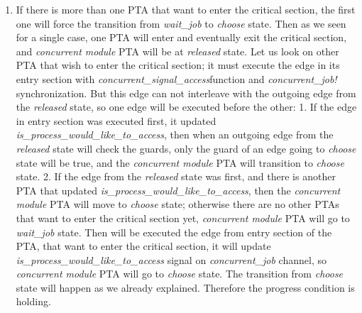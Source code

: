 \begin{enumerate}
\begin{enumerate}
\item If there is more than one PTA that want to enter the critical section, the first one will force the transition from \textcolor{ColorUppaalState}{\textit{wait_job}} to \textcolor{ColorUppaalState}{\textit{choose}} state. Then as we seen for a single case, one PTA will enter and eventually exit the critical section, and \textit{concurrent module} PTA will be at \textcolor{ColorUppaalState}{\textit{released}} state. Let us look on other PTA that wish to enter the critical section; it must execute the edge in its entry section with \textcolor{ColorUppaalFunction}{\textit{concurrent_signal_access}}​ function and \textcolor{ColorUppaalChannel}{\textit{concurrent_job!}} synchronization. But this edge can not interleave with the outgoing edge from the \textcolor{ColorUppaalState}{\textit{released}} state, so one edge will be executed before the other: 1. If the edge in entry section was executed first, it updated \textcolor{ColorEdgeGuard}{\textit{is_process_would_like_to_access}}, then when an outgoing edge from the \textcolor{ColorUppaalState}{\textit{released}} state will check the guards, only the guard of an edge going to \textcolor{ColorUppaalState}{\textit{choose}} state will be true, and the \textit{concurrent module} PTA will transition to \textcolor{ColorUppaalState}{\textit{choose}} state. 2. If the edge from the \textcolor{ColorUppaalState}{\textit{released}} state was first, and there is another PTA that updated \textcolor{ColorEdgeGuard}{\textit{is_process_would_like_to_access}}, then the \textit{concurrent module} PTA will move to \textcolor{ColorUppaalState}{\textit{choose}} state; otherwise there are no other PTAs that want to enter the critical section yet, \textit{concurrent module} PTA will go to \textcolor{ColorUppaalState}{\textit{wait_job}} state. Then will be executed the edge from entry section of the PTA, that want to enter the critical section, it will update \textcolor{ColorEdgeGuard}{\textit{is_process_would_like_to_access}} signal on \textcolor{ColorUppaalChannel}{\textit{concurrent_job}} channel, so \textit{concurrent module} PTA will go to \textcolor{ColorUppaalState}{\textit{choose}} state. The transition from \textcolor{ColorUppaalState}{\textit{choose}} state will happen as we already explained. Therefore the progress condition is holding.
\end{enumerate} 

\end{enumerate}
